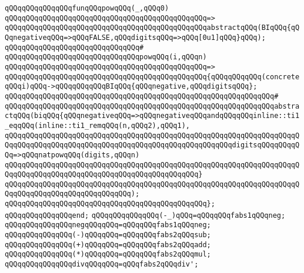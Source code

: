 \verb|qQQqqQQqqQQqqQQqfunqQQqpowqQQq(_,qQQq0)|\newline
\verb|qQQqqQQqqQQqqQQqqQQqqQQqqQQqqQQqqQQqqQQqqQQqqQQq=>|\newline
\verb|qQQqqQQqqQQqqQQqqQQqqQQqqQQqqQQqqQQqqQQqqQQqqQQqabstractqQQq(BIqQQq{qQQqnegativeqQQq=>qQQqFALSE,qQQqdigitsqQQq=>qQQq[0u1]qQQq}qQQq);|\newline
\verb|qQQqqQQqqQQqqQQqqQQqqQQqqQQqqQQq#|\newline
\verb|qQQqqQQqqQQqqQQqqQQqqQQqqQQqqQQqpowqQQq(i,qQQqn)|\newline
\verb|qQQqqQQqqQQqqQQqqQQqqQQqqQQqqQQqqQQqqQQqqQQqqQQq=>|\newline
\verb|qQQqqQQqqQQqqQQqqQQqqQQqqQQqqQQqqQQqqQQqqQQqqQQq{qQQqqQQqqQQq(concreteqQQqi)qQQq->qQQqqQQqqQQqBIqQQq{qQQqnegative,qQQqdigitsqQQq};|\newline
\verb|qQQqqQQqqQQqqQQqqQQqqQQqqQQqqQQqqQQqqQQqqQQqqQQqqQQqqQQqqQQqqQQq#|\newline
\verb|qQQqqQQqqQQqqQQqqQQqqQQqqQQqqQQqqQQqqQQqqQQqqQQqqQQqqQQqqQQqqQQqabstractqQQq(biqQQq{qQQqnegativeqQQq=>qQQqnegativeqQQqandqQQqqQQqinline::ti1_eqqQQq(inline::ti1_remqQQq(n,qQQq2),qQQq1),|\newline
\verb|qQQqqQQqqQQqqQQqqQQqqQQqqQQqqQQqqQQqqQQqqQQqqQQqqQQqqQQqqQQqqQQqqQQqqQQqqQQqqQQqqQQqqQQqqQQqqQQqqQQqqQQqqQQqqQQqqQQqqQQqqQQqdigitsqQQqqQQqqQQq=>qQQqnatpowqQQq(digits,qQQqn)|\newline
\verb|qQQqqQQqqQQqqQQqqQQqqQQqqQQqqQQqqQQqqQQqqQQqqQQqqQQqqQQqqQQqqQQqqQQqqQQqqQQqqQQqqQQqqQQqqQQqqQQqqQQqqQQqqQQqqQQqqQQq}|\newline
\verb|qQQqqQQqqQQqqQQqqQQqqQQqqQQqqQQqqQQqqQQqqQQqqQQqqQQqqQQqqQQqqQQqqQQqqQQqqQQqqQQqqQQqqQQqqQQqqQQqqQQq);|\newline
\verb|qQQqqQQqqQQqqQQqqQQqqQQqqQQqqQQqqQQqqQQqqQQqqQQq};|\newline
\verb|qQQqqQQqqQQqqQQqend;|\newline
\newline
\verb|qQQqqQQqqQQqqQQq(-_)qQQq=qQQqqQQqfabs1qQQqneg;|\newline
\verb|qQQqqQQqqQQqqQQqnegqQQqqQQq=qQQqqQQqfabs1qQQqneg;|\newline
\verb|qQQqqQQqqQQqqQQq(-)qQQqqQQq=qQQqqQQqfabs2qQQqsub;|\newline
\verb|qQQqqQQqqQQqqQQq(+)qQQqqQQq=qQQqqQQqfabs2qQQqadd;|\newline
\verb|qQQqqQQqqQQqqQQq(*)qQQqqQQq=qQQqqQQqfabs2qQQqmul;|\newline
\newline
\verb|qQQqqQQqqQQqqQQqdivqQQqqQQq=qQQqfabs2qQQqdiv';|\newline
